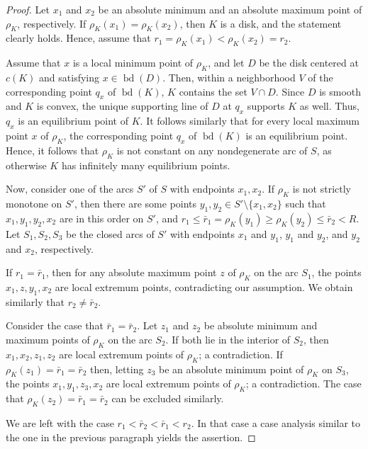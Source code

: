 \documentclass[twoside]{amsart}
\theoremstyle{plain}
\theoremstyle{definition}
\numberwithin{equation}{section}
\DeclareMathOperator{\bd}{bd}
\begin{document}
\begin{proof}
Let $x_1$ and $x_2$ be an absolute minimum and an absolute maximum point of $\rho_K$, respectively. If $\rho_K(x_1)=\rho_K(x_2)$, then $K$ is a disk, and the statement clearly holds. Hence, assume that $r_1=\rho_K(x_1) < \rho_K(x_2)=r_2$.

Assume that $x$ is a local minimum point of $\rho_K$, and let $D$ be the disk centered at $c(K)$ and satisfying $x \in \bd(D)$. Then, within a neighborhood $V$ of the corresponding point $q_x$ of $\bd(K)$, $K$ contains the set $V \cap D$. Since $D$ is smooth and $K$ is convex, the unique supporting line of $D$ at $q_x$ supports $K$ as well. Thus, $q_x$ is an equilibrium point of $K$. It follows similarly that for every local maximum point $x$ of $\rho_K$, the corresponding point $q_x$ of $\bd(K)$  is an equilibrium point. Hence, it follows that $\rho_K$ is not constant on any nondegenerate arc of $S$, as otherwise $K$ has infinitely many equilibrium points.

Now, consider one of the arcs $S'$ of $S$ with endpoints $x_1, x_2$. If $\rho_K$ is not strictly monotone on $S'$, then there are some points $y_1, y_2 \in S' \setminus \{ x_1, x_2 \}$ such that $x_1, y_1, y_2, x_2$ are in this order on $S'$, and $r_1 \leq \bar{r}_1 = \rho_K(y_1) \geq \rho_K(y_2) \leq \bar{r}_2 < R$. Let $S_1, S_2, S_3$ be the closed arcs of $S'$ with endpoints $x_1$ and $y_1$, $y_1$ and $y_2$, and $y_2$ and $x_2$, respectively.

If $r_1 = \bar{r}_1$, then for any absolute maximum point $z$ of $\rho_K$ on the arc $S_1$, the points $x_1, z, y_1, x_2$ are local extremum points, contradicting our assumption. We obtain similarly that $r_2 \neq \bar{r}_2$.

Consider the case that $\bar{r}_1 = \bar{r}_2$. Let $z_1$ and $z_2$ be absolute minimum and maximum points of $\rho_K$ on the arc $S_2$. If both lie in the interior of $S_2$, then $x_1, x_2, z_1, z_2$ are local extremum points of $\rho_K$; a contradiction. If $\rho_K(z_1)=\bar{r}_1=\bar{r}_2$ then, letting $z_3$ be an absolute minimum point of $\rho_K$ on $S_3$, the points $x_1, y_1, z_3, x_2$ are local extremum points of $\rho_K$; a contradiction. The case that $\rho_K(z_2)=\bar{r}_1=\bar{r}_2$ can be excluded similarly.

We are left with the case $r_1 < \bar{r}_2 < \bar{r}_1 < r_2$. In that case a case analysis similar to the one in the previous paragraph yields the assertion.
\end{proof}
\end{document}
